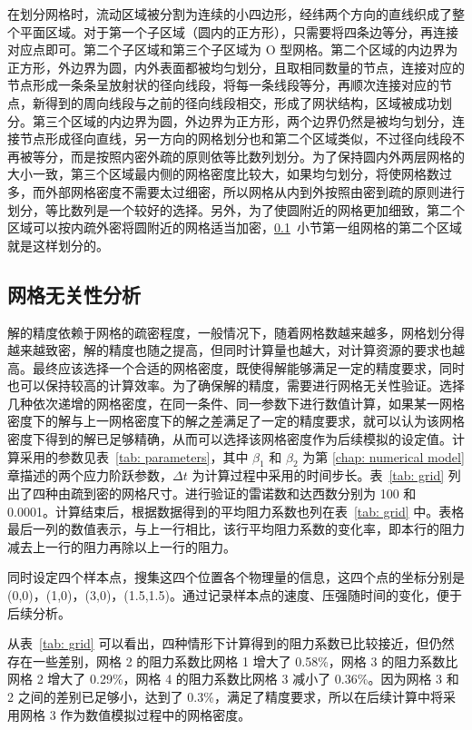 在划分网格时，流动区域被分割为连续的小四边形，经纬两个方向的直线织成了整个平面区域。对于第一个子区域（圆内的正方形），只需要将四条边等分，再连接对应点即可。第二个子区域和第三个子区域为 O 型网格。第二个区域的内边界为正方形，外边界为圆，内外表面都被均匀划分，且取相同数量的节点，连接对应的节点形成一条条呈放射状的径向线段，将每一条线段等分，再顺次连接对应的节点，新得到的周向线段与之前的径向线段相交，形成了网状结构，区域被成功划分。第三个区域的内边界为圆，外边界为正方形，两个边界仍然是被均匀划分，连接节点形成径向直线，另一方向的网格划分也和第二个区域类似，不过径向线段不再被等分，而是按照内密外疏的原则依等比数列划分。为了保持圆内外两层网格的大小一致，第三个区域最内侧的网格密度比较大，如果均匀划分，将使网格数过多，而外部网格密度不需要太过细密，所以网格从内到外按照由密到疏的原则进行划分，等比数列是一个较好的选择。另外，为了使圆附近的网格更加细致，第二个区域可以按内疏外密将圆附近的网格适当加密，\ref{subsec: grid-independent}~小节第一组网格的第二个区域就是这样划分的。

\subsection{网格无关性分析}\label{subsec: grid-independent}

解的精度依赖于网格的疏密程度，一般情况下，随着网格数越来越多，网格划分得越来越致密，解的精度也随之提高，但同时计算量也越大，对计算资源的要求也越高。最终应该选择一个合适的网格密度，既使得解能够满足一定的精度要求，同时也可以保持较高的计算效率。为了确保解的精度，需要进行网格无关性验证。选择几种依次递增的网格密度，在同一条件、同一参数下进行数值计算，如果某一网格密度下的解与上一网格密度下的解之差满足了一定的精度要求，就可以认为该网格密度下得到的解已足够精确，从而可以选择该网格密度作为后续模拟的设定值。计算采用的参数见表~\ref{tab: parameters}，其中 $\beta_1$ 和 $\beta_2$ 为第 \ref{chap: numerical model} 章描述的两个应力阶跃参数，$\Delta t$ 为计算过程中采用的时间步长。表~\ref{tab: grid} 列出了四种由疏到密的网格尺寸。进行验证的雷诺数和达西数分别为 100 和 0.0001。计算结束后，根据数据得到的平均阻力系数也列在表~\ref{tab: grid} 中。表格最后一列的数值表示，与上一行相比，该行平均阻力系数的变化率，即本行的阻力减去上一行的阻力再除以上一行的阻力。

同时设定四个样本点，搜集这四个位置各个物理量的信息，这四个点的坐标分别是 (0,0)，(1,0)，(3,0)，(1.5,1.5)。通过记录样本点的速度、压强随时间的变化，便于后续分析。

从表~\ref{tab: grid} 可以看出，四种情形下计算得到的阻力系数已比较接近，但仍然存在一些差别，网格 2 的阻力系数比网格 1 增大了 0.58\%，网格 3 的阻力系数比网格 2 增大了 0.29\%，网格 4 的阻力系数比网格 3 减小了 0.36\%。因为网格 3 和 2 之间的差别已足够小，达到了 0.3\%，满足了精度要求，所以在后续计算中将采用网格 3 作为数值模拟过程中的网格密度。

